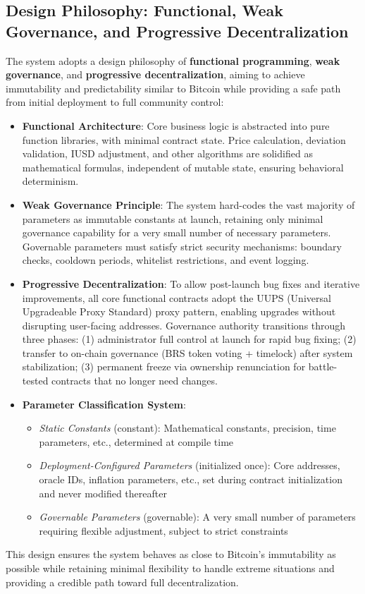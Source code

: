 \documentclass{article}
\begin{document}
\subsection{Design Philosophy: Functional, Weak Governance, and Progressive Decentralization}
The system adopts a design philosophy of \textbf{functional programming}, \textbf{weak governance}, and \textbf{progressive decentralization}, aiming to achieve immutability and predictability similar to Bitcoin while providing a safe path from initial deployment to full community control:
\begin{itemize}
  \item \textbf{Functional Architecture}: Core business logic is abstracted into pure function libraries, with minimal contract state. Price calculation, deviation validation, IUSD adjustment, and other algorithms are solidified as mathematical formulas, independent of mutable state, ensuring behavioral determinism.
  \item \textbf{Weak Governance Principle}: The system hard-codes the vast majority of parameters as immutable constants at launch, retaining only minimal governance capability for a very small number of necessary parameters. Governable parameters must satisfy strict security mechanisms: boundary checks, cooldown periods, whitelist restrictions, and event logging.
  \item \textbf{Progressive Decentralization}: To allow post-launch bug fixes and iterative improvements, all core functional contracts adopt the UUPS (Universal Upgradeable Proxy Standard) proxy pattern, enabling upgrades without disrupting user-facing addresses. Governance authority transitions through three phases: (1) administrator full control at launch for rapid bug fixing; (2) transfer to on-chain governance (BRS token voting + timelock) after system stabilization; (3) permanent freeze via ownership renunciation for battle-tested contracts that no longer need changes.
  \item \textbf{Parameter Classification System}:
    \begin{itemize}
      \item \textit{Static Constants} (constant): Mathematical constants, precision, time parameters, etc., determined at compile time
      \item \textit{Deployment-Configured Parameters} (initialized once): Core addresses, oracle IDs, inflation parameters, etc., set during contract initialization and never modified thereafter
      \item \textit{Governable Parameters} (governable): A very small number of parameters requiring flexible adjustment, subject to strict constraints
    \end{itemize}
\end{itemize}
This design ensures the system behaves as close to Bitcoin's immutability as possible while retaining minimal flexibility to handle extreme situations and providing a credible path toward full decentralization.
\end{document}

